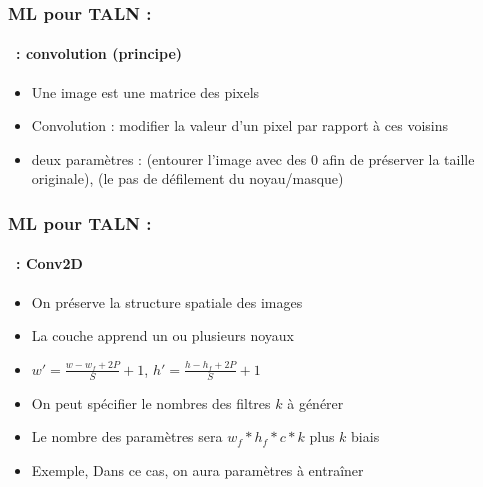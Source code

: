 \documentclass[xcolor=table]{beamer}
\begin{document}
\begin{frame}
	\frametitle{ML pour TALN : \insertsection}
	\framesubtitle{\insertsubsection\ : convolution (principe)}
	
	\begin{itemize}
		\item Une image est une matrice des pixels
		\item Convolution : modifier la valeur d'un pixel par rapport à ces voisins
		\item deux paramètres :  (entourer l'image avec des 0 afin de préserver la taille originale),  (le pas de défilement du noyau/masque)
	\end{itemize}
	
	\begin{center}
	\end{center}
	
\end{frame}

\begin{frame}
	\frametitle{ML pour TALN : \insertsection}
	\framesubtitle{\insertsubsection\ : Conv2D}
	
	\begin{minipage}{0.60\textwidth} 
		\begin{itemize}
			\item On préserve la structure spatiale des images
			\item La couche apprend un ou plusieurs noyaux
			\item $ w' = \frac{w - w_f + 2P}{S} + 1$,  $ h' = \frac{h - h_f + 2P}{S} + 1$
			\item On peut spécifier le nombres des filtres $k$ à générer 
			\item Le nombre des paramètres sera $w_f * h_f * c * k$ plus $k$ biais
			\item Exemple,  Dans ce cas, on aura  paramètres à entraîner
		\end{itemize}
	\end{minipage}
	\begin{minipage}{0.39\textwidth}
	\end{minipage}
	
\end{frame}
\end{document}
